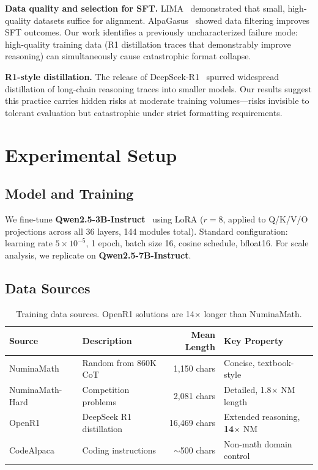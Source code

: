\documentclass{article}
\begin{document}
\textbf{Data quality and selection for SFT.} LIMA~\citep{zhou2023lima} demonstrated that small, high-quality datasets suffice for alignment. AlpaGasus~\citep{chen2023alpagasus} showed data filtering improves SFT outcomes. Our work identifies a previously uncharacterized failure mode: high-quality training data (R1 distillation traces that demonstrably improve reasoning) can simultaneously cause catastrophic format collapse.

\textbf{R1-style distillation.} The release of DeepSeek-R1~\citep{openr1} spurred widespread distillation of long-chain reasoning traces into smaller models. Our results suggest this practice carries hidden risks at moderate training volumes---risks invisible to tolerant evaluation but catastrophic under strict formatting requirements.

\section{Experimental Setup}

\subsection{Model and Training}

We fine-tune \textbf{Qwen2.5-3B-Instruct}~\citep{yang2024qwen} using LoRA ($r{=}8$, applied to Q/K/V/O projections across all 36 layers, 144 modules total). Standard configuration: learning rate $5{\times}10^{-5}$, 1 epoch, batch size 16, cosine schedule, bfloat16. For scale analysis, we replicate on \textbf{Qwen2.5-7B-Instruct}.

\subsection{Data Sources}

\begin{table}[h]
\centering
\caption{Training data sources. OpenR1 solutions are 14$\times$ longer than NuminaMath.}
\label{tab:sources}
\small
\begin{tabular}{@{}llrl@{}}
\toprule
Source & Description & Mean Length & Key Property \\
\midrule
NuminaMath & Random from 860K CoT & 1,150 chars & Concise, textbook-style \\
NuminaMath-Hard & Competition problems & 2,081 chars & Detailed, 1.8$\times$ NM length \\
OpenR1 & DeepSeek R1 distillation & 16,469 chars & Extended reasoning, \textbf{14$\times$} NM \\
CodeAlpaca & Coding instructions & ${\sim}$500 chars & Non-math domain control \\
\bottomrule
\end{tabular}
\end{table}
\end{document}
